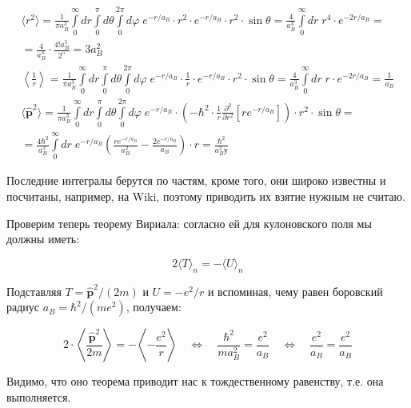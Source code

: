 \documentclass[a4paper, 12pt]{article}
\newcommand{\qlrq}
{\ensuremath{\quad \Leftrightarrow \quad}} %
\renewcommand{\phi}{\varphi} %
\begin{document}
\begin{align*}
	\langle r^2 \rangle = \frac{1}{\pi a_B^3} \int\limits_{0}^{\infty} dr \int\limits_{0}^{\pi} d\theta \int\limits_{0}^{2\pi} d\phi \; e^{-r / a_B} \cdot r^2 \cdot e^{-r / a_B} \cdot r^2 \cdot \sin \theta  = \frac{4}{a^3_B} \int\limits_0^\infty dr \; r^4 \cdot e^{-2r / a_B} = \\
	= \frac{4}{a_B^3} \cdot \frac{4! a_B^5}{2^5} = \boxed{3 a_B^2}\\
	\left \langle \frac{1}{r} \right \rangle = \frac{1}{\pi a_B^3} \int\limits_{0}^{\infty} dr \int\limits_{0}^{\pi} d\theta \int\limits_{0}^{2\pi} d\phi \; e^{-r / a_B} \cdot \frac{1}{r} \cdot e^{-r / a_B} \cdot r^2 \cdot \sin \theta = \frac{4}{a_B^3} \int\limits_0^\infty dr \; r \cdot e^{-2r / a_B} = \boxed{\frac{1}{a_B}}\\
	\langle \hat{\mathbf{p}}^2 \rangle = \frac{1}{\pi a_B^3} \int\limits_{0}^{\infty} dr \int\limits_{0}^{\pi} d\theta \int\limits_{0}^{2\pi} d\phi \; e^{-r / a_B} \cdot \left(-\hbar^2 \cdot  \frac{1}{r} \frac{\partial^2}{\partial r^2} \left[r e^{-r / a_B}\right]\right)  \cdot r^2 \cdot \sin \theta = \\
	= \frac{4 \hbar^2}{a_B^3} \int\limits_0^\infty dr \; e^{-r/a_B}\left(\frac{r e^{-r/a_B}}{a_B^2}-\frac{2 e^{-r/a_B}}{a_B}\right) \cdot r = \boxed{\frac{\hbar^2}{a_B^2у}}
\end{align*}

Последние интегралы берутся по частям, кроме того, они широко известны и посчитаны, например, на Wiki, поэтому приводить их взятие нужным не считаю.

Проверим теперь теорему Вириала: согласно ей для кулоновского поля мы должны иметь:

\begin{equation*}
	2\langle T\rangle_n = - \langle U \rangle_n
\end{equation*}

Подставляя $T = \hat{\mathbf{p}}^2 / (2m)$ и $U = -e^2 / r$ и вспоминая, чему равен боровский радиус $a_B = \hbar^2 / (m e^2)$, получаем:

\begin{equation*}
	2 \cdot \left\langle \frac{\hat{\mathbf{p}}^2}{2m}\right\rangle = - \left\langle -\frac{e^2}{r}\right\rangle \qlrq \frac{\hbar^2}{m a_B^2} = \frac{e^2}{a_B} \qlrq \frac{e^2}{a_B} = \frac{e^2}{a_B}
\end{equation*} 

Видимо, что оно теорема приводит нас к тождественному равенству, т.е. она выполняется.
	
\end{document}
